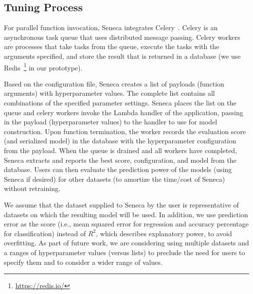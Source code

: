\subsection{Tuning Process}

For parallel function invocation, Seneca integrates 
Celery~\cite{ref:celery}. Celery is an asynchronous task queue 
that uses distributed message passing. Celery workers are processes 
that take tasks from the queue, execute the tasks with the arguments specified, 
and store the result that is returned 
in a database (we use Redis~\footnote{\url{https://redis.io/}} in our prototype). 

Based on the configuration file, Seneca creates a list of 
payloads (function arguments) with
hyperparameter values.  
The complete list contains all combinations of the specified parameter
settings.  Seneca places the list on the queue and celery 
workers invoke the Lambda handler of the application, passing in the
payload (hyperparameter values) to the handler to use for model construction.  
Upon function
termination, the worker records the evaluation score (and serialized model)
in the database with the hyperparameter configuration from the payload.
When the queue is drained and all workers have completed, Seneca
extracts and reports the best score, configuration, and model from the database.
Users can then evaluate the prediction power of the models (using Seneca if desired) 
for other datasets (to amortize the time/cost of Seneca) without retraining. 

We assume that the dataset supplied to Seneca by the user
is representative of datasets on which the 
resulting model will be used.  In addition, we use prediction error as the 
score (i.e., mean squared error for regression and accuracy percentage for classification) 
instead of $R^2$, which describes explanatory power, to avoid overfitting.
As part of future work, we are considering using multiple datasets and a ranges
of hyperparameter values (versus lists) to preclude the need for users to specify
them and to consider a wider range of values.

